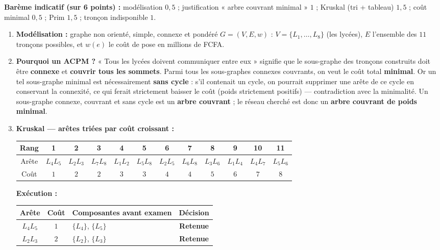 \documentclass[11pt]{article}
\begin{document}
\begin{corrige}
\textbf{Barème indicatif (sur 6 points) :} modélisation $0,5$ ; justification « arbre couvrant minimal » $1$ ; Kruskal (tri + tableau) $1,5$ ; coût minimal $0,5$ ; Prim $1,5$ ; tronçon indisponible $1$.
\begin{enumerate}
\item \textbf{Modélisation :} graphe non orienté, simple, connexe et pondéré $G = (V, E, w)$ : $V = \{L_1, \dots, L_8\}$ (les lycées), $E$ l'ensemble des $11$ tronçons possibles, et $w(e)$ le coût de pose en millions de FCFA.
\item \textbf{Pourquoi un ACPM ?} « Tous les lycées doivent communiquer entre eux » signifie que le sous-graphe des tronçons construits doit être \textbf{connexe} et \textbf{couvrir tous les sommets}. Parmi tous les sous-graphes connexes couvrants, on veut le coût total \textbf{minimal}. Or un tel sous-graphe minimal est nécessairement \textbf{sans cycle} : s'il contenait un cycle, on pourrait supprimer une arête de ce cycle en conservant la connexité, ce qui ferait strictement baisser le coût (poids strictement positifs) — contradiction avec la minimalité. Un sous-graphe connexe, couvrant et sans cycle est un \textbf{arbre couvrant} ; le réseau cherché est donc un \textbf{arbre couvrant de poids minimal}.
\item \textbf{Kruskal — arêtes triées par coût croissant :}
\begin{center}
\begin{tabular}{|c|c|c|c|c|c|c|c|c|c|c|c|}
\hline
\rowcolor{popblueL} Rang & 1 & 2 & 3 & 4 & 5 & 6 & 7 & 8 & 9 & 10 & 11 \\
\hline
Arête & $L_4L_5$ & $L_2L_3$ & $L_7L_8$ & $L_1L_2$ & $L_5L_8$ & $L_2L_5$ & $L_6L_8$ & $L_3L_6$ & $L_1L_4$ & $L_4L_7$ & $L_5L_6$ \\
\hline
Coût & $1$ & $2$ & $2$ & $3$ & $3$ & $4$ & $4$ & $5$ & $6$ & $7$ & $8$ \\
\hline
\end{tabular}
\end{center}
\textbf{Exécution :}
\begin{center}
\begin{tabular}{|c|c|l|c|}
\hline
\rowcolor{popblueL} Arête & Coût & Composantes avant examen & Décision \\
\hline
$L_4L_5$ & $1$ & $\{L_4\}$, $\{L_5\}$ & \textbf{Retenue} \\
$L_2L_3$ & $2$ & $\{L_2\}$, $\{L_3\}$ & \textbf{Retenue} \\

\end{tabular}
\end{center}
\end{enumerate}
\end{corrige}
\end{document}
